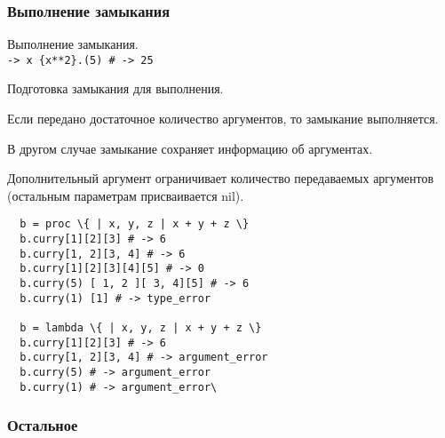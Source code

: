 \subsubsection*{Выполнение замыкания}

\begin{methodlist}
  Выполнение замыкания. 
  \\\verb!-> x {x**2}.(5) # -> 25!
 
  Подготовка замыкания для выполнения.

  Если передано достаточное количество аргументов, то замыкание выполняется.

  В другом случае замыкание сохраняет информацию об аргументах.

  Дополнительный аргумент ограничивает количество передаваемых аргументов (остальным параметрам присваивается nil).
  \begin{verbatim}
  b = proc \{ | x, y, z | x + y + z \} 
  b.curry[1][2][3] # -> 6 
  b.curry[1, 2][3, 4] # -> 6 
  b.curry[1][2][3][4][5] # -> 0 
  b.curry(5) [ 1, 2 ][ 3, 4][5] # -> 6 
  b.curry(1) [1] # -> type_error

  b = lambda \{ | x, y, z | x + y + z \} 
  b.curry[1][2][3] # -> 6 
  b.curry[1, 2][3, 4] # -> argument_error 
  b.curry(5) # -> argument_error 
  b.curry(1) # -> argument_error\
  \end{verbatim}
\end{methodlist}

\subsubsection*{Остальное}

